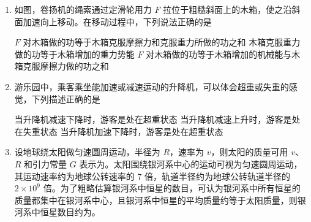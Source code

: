 \documentclass[\gkver]{gaokaozhenti}
\begin{document}
\begin{enumerate}
\item
如图，卷扬机的绳索通过定滑轮用力 $F$ 拉位于粗糙斜面上的木箱，使之沿斜面加速向上移动。在移动过程中，下列说法正确的是

\onepicture[w=7.26cm]{}

{$F$ 对木箱做的功等于木箱克服摩擦力和克服重力所做的功之和}
{木箱克服重力做的功等于木箱增加的重力势能}
{$F$ 对木箱做的功等于木箱增加的机械能与木箱克服摩擦力做的功之和}


\item
游乐园中，乘客乘坐能加速或减速运动的升降机，可以体会超重或失重的感觉，下列描述正确的是

{当升降机减速下降时，游客是处在超重状态}
{当升降机减速上升时，游客是处在失重状态}
{当升降机加速下降时，游客是处在超重状态}


\item
设地球绕太阳做匀速圆周运动，半径为 $R$，速率为 $v$，则太阳的质量可用 $v$、$R$ 和引力常量 $G$ 表示为。太阳围绕银河系中心的运动可视为匀速圆周运动，其运动速率约为地球公转速率的 7 倍，轨道半径约为地球公转轨道半径的 $2\times10^{9}$ 倍。为了粗略估算银河系中恒星的数目，可认为银河系中所有恒星的质量都集中在银河系中心，且银河系中恒星的平均质量约等于太阳质量，则银河系中恒星数目约为。


\end{enumerate}
\end{document}

